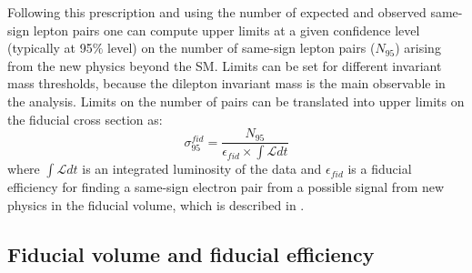 Following this prescription and using the number of expected and observed same-sign lepton pairs one can compute 
upper limits at a given confidence level (typically at 95$\%$ level) on the number of same-sign lepton pairs ($N_{95}$)
arising from the new physics beyond the SM. Limits can be set for different invariant mass thresholds, 
because the dilepton invariant mass is the main observable in the analysis.
Limits on the number of pairs can be translated into upper limits on the fiducial cross section as:
\begin{equation}
 \sigma_{95}^{fid} = \dfrac{N_{95}}{\epsilon_{fid} \times \int \mathscr{L} dt}
 \label{eq:fid_cross_section}
\end{equation}
where $\int \mathscr{L} dt$ is an integrated luminosity of the data and $\epsilon_{fid}$ is a fiducial efficiency for finding a same-sign electron pair from
a possible signal from new physics in the fiducial volume, which is described in .


\subsection{Fiducial volume and fiducial efficiency}
\label{subsec:fid_volume_eff}

